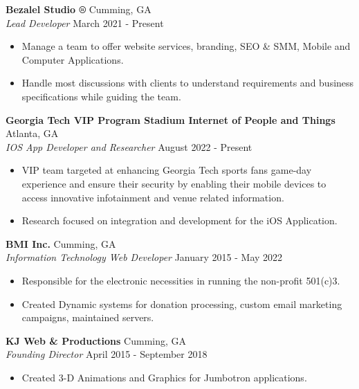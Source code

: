 \documentclass[a4paper]{article}
\begin{document}
\textbf{Bezalel Studio ®} \hfill Cumming, GA\\
\textit{Lead Developer} \hfill March 2021 - Present\\
\vspace{-1mm}
\begin{itemize} \itemsep 1pt
	\item Manage a team to offer website services, branding, SEO \& SMM, Mobile and Computer Applications.
	\item Handle most discussions with clients to understand requirements and business specifications while guiding the team.
\end{itemize}
\textbf{Georgia Tech VIP Program \textbar{} Stadium Internet of People and Things} \hfill Atlanta, GA\\
\textit{IOS App Developer and Researcher} \hfill August 2022 - Present\\
\vspace{-1mm}
\begin{itemize} \itemsep 1pt
	\item VIP team targeted at enhancing Georgia Tech sports fans\textquotesingle{} game-day experience and ensure their security by enabling their mobile devices to access innovative infotainment and venue related information.
	\item Research focused on integration and development for the iOS Application.
\end{itemize}
\textbf{BMI Inc.} \hfill Cumming, GA\\
\textit{Information Technology Web Developer} \hfill January 2015 - May 2022\\
\vspace{-1mm}
\begin{itemize} \itemsep 1pt
	\item Responsible for the electronic necessities in running the non-profit 501(c)3.
	\item Created Dynamic systems for donation processing, custom email marketing campaigns, maintained servers.
\end{itemize}
\textbf{KJ Web \& Productions} \hfill Cumming, GA\\
\textit{Founding Director} \hfill April 2015 - September 2018\\
\vspace{-1mm}
\begin{itemize} \itemsep 1pt
	\item Created 3-D Animations and Graphics for Jumbotron applications.
\end{itemize}
\end{document}
